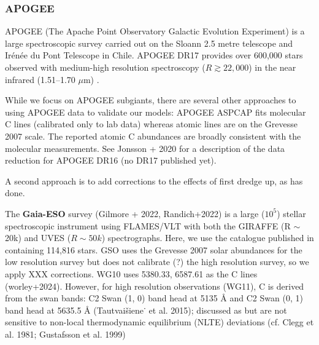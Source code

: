 \documentclass[11pt]{article}
\newcommand{\caah}{[C/Mg]-[Mg/H]}
\newcommand{\caafe}{[C/Mg]-[Mg/Fe]}
\begin{document}




\subsubsection{APOGEE} 
APOGEE (The Apache Point Observatory Galactic Evolution Experiment) is a large spectroscopic survey carried out on the Sloann 2.5 metre telescope and Irénée du Pont Telescope in Chile.
APOGEE DR17 provides over 600,000 stars observed with medium-high resolution spectroscopy ($R\gtrsim 22,000$) in the near infrared (1.51–1.70 $\mu$m) \citep{apogee17}.

While we focus on APOGEE subgiants, there are several other approaches to using APOGEE data to validate our models:
APOGEE ASPCAP fits molecular C lines (calibrated only to lab data) whereas atomic lines are on the Grevesse 2007 scale. The reported atomic C abundances are broadly consistent with the molecular measurements. 
See Jonsson + 2020 for a description of the data reduction for APOGEE DR16 (no DR17 published yet).

A second approach is to add corrections to the effects of first dredge up, as \citet{vincenzo+21} has done.


The {\bf Gaia-ESO} survey (Gilmore + 2022, Randich+2022) is a large ($10^5$) stellar spectroscopic instrument using FLAMES/VLT with both the GIRAFFE (R $\sim$ 20k) and UVES ($R\sim 50k$) spectrographs. 
Here, we use the catalogue published in  \citep{hourihane+2023} containing 114,816 stars.
GSO uses the Grevesse 2007 solar abundances for the low resolution survey but does not calibrate (?) the high resolution survey, so we apply XXX corrections.
WG10 uses 5380.33, 6587.61 as the C lines (worley+2024).
However, for high resolution observations (WG11), C is derived from the swan bands:
C2 Swan (1, 0) band head at 5135 Å and C2 Swan (0, 1) band head at 5635.5 Å
(Tautvaišiene˙ et al. 2015); discussed as but are not sensitive to non-local thermodynamic equilibrium (NLTE) deviations (cf. Clegg et al. 1981;
Gustafsson et al. 1999) 
\end{document}
